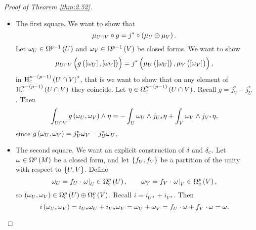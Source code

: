 \begin{proof}[Proof of Theorem \ref{thm:2.52}]
\begin{itemize}
\item The first square. We want to show that
$$ \mu_{U \cap V} \circ g = j^* \circ \br{\mu_U \oplus \mu_V}. $$
Let $ \omega_U \in \Omega^{p - 1}\br{U} $ and $ \omega_V \in \Omega^{p - 1}\br{V} $ be closed forms. We want to show
$$ \mu_{U \cap V}\br{g\br{\sbr{\omega_U}, \sbr{\omega_V}}} = j^*\br{\mu_U\br{\sbr{\omega_U}}, \mu_V\br{\sbr{\omega_V}}}, $$
in $ \H_\c^{n - \br{p - 1}}\br{U \cap V}^* $, that is we want to show that on any element of $ \H_\c^{n - \br{p - 1}}\br{U \cap V} $ they coincide. Let $ \eta \in \Omega_\c^{n - \br{p - 1}}\br{U \cap V} $. Recall $ g = j_V^* - j_U^* $. Then
$$ \int_{U \cap V} g\br{\omega_U, \omega_V} \wedge \eta = -\int_U \omega_U \wedge j_{U*}\eta + \int_V \omega_V \wedge j_{V^*}\eta, $$
since $ g\br{\omega_U, \omega_V} = j_V^*\omega_V - j_U^*\omega_U $.


\item The second square. We want an explicit construction of $ \delta $ and $ \delta_{\mathrm{c}} $. Let $ \omega \in \Omega^p\br{M} $ be a closed form, and let $ \cbr{f_U, f_V} $ be a partition of the unity with respect to $ \cbr{U, V} $. Define
$$ \omega_U = f_U \cdot \eval{\omega}_U \in \Omega_\c^p\br{U}, \qquad \omega_V = f_V \cdot \eval{\omega}_V \in \Omega_\c^p\br{V}, $$
so $ \br{\omega_U, \omega_V} \in \Omega_\c^p\br{U} \oplus \Omega_\c^p\br{V} $. Recall $ i = i_{U*} + i_{V*} $. Then
$$ i\br{\omega_U, \omega_V} = i_{U*}\omega_U + i_{V*}\omega_V = \omega_U + \omega_V = f_U \cdot \omega + f_V \cdot \omega = \omega. $$

\pagebreak


\end{itemize}
\end{proof}
